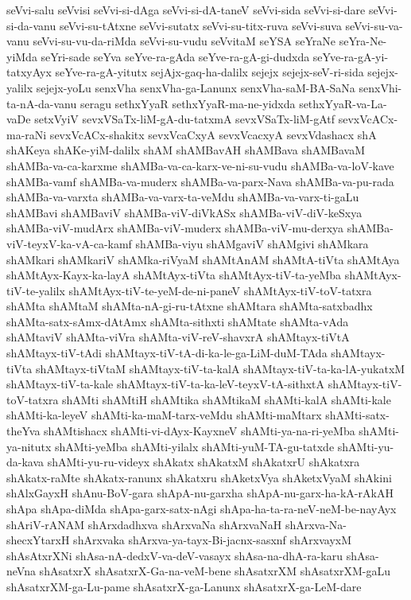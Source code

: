 {seVvi-salu
seVvisi
seVvi-si-dAga
seVvi-si-dA-taneV
seVvi-sida
seVvi-si-dare
seVvi-si-da-vanu
seVvi-su-tAtxne
seVvi-sutatx
seVvi-su-titx-ruva
seVvi-suva
seVvi-su-va-vanu
seVvi-su-vu-da-riMda
seVvi-su-vudu
seVvitaM
seYSA
seYraNe
seYra-Ne-yiMda
seYri-sade
seYva
seYve-ra-gAda
seYve-ra-gA-gi-dudxda
seYve-ra-gA-yi-tatxyAyx
seYve-ra-gA-yitutx
sejAjx-gaq-ha-dalilx
sejejx
sejejx-seV-ri-sida
sejejx-yalilx
sejejx-yoLu
senxVha
senxVha-ga-Lanunx
senxVha-saM-BA-SaNa
senxVhi-ta-nA-da-vanu
seragu
sethxYyaR
sethxYyaR-ma-ne-yidxda
sethxYyaR-va-La-vaDe
setxVyiV
sevxVSaTx-liM-gA-du-tatxmA
sevxVSaTx-liM-gAtf
sevxVcACx-ma-raNi
sevxVcACx-shakitx
sevxVcaCxyA
sevxVcacxyA
sevxVdashacx
shA
shAKeya
shAKe-yiM-dalilx
shAM
shAMBavAH
shAMBava
shAMBavaM
shAMBa-va-ca-karxme
shAMBa-va-ca-karx-ve-ni-su-vudu
shAMBa-va-loV-kave
shAMBa-vamf
shAMBa-va-muderx
shAMBa-va-parx-Nava
shAMBa-va-pu-rada
shAMBa-va-varxta
shAMBa-va-varx-ta-veMdu
shAMBa-va-varx-ti-gaLu
shAMBavi
shAMBaviV
shAMBa-viV-diVkASx
shAMBa-viV-diV-keSxya
shAMBa-viV-mudArx
shAMBa-viV-muderx
shAMBa-viV-mu-derxya
shAMBa-viV-teyxV-ka-vA-ca-kamf
shAMBa-viyu
shAMgaviV
shAMgivi
shAMkara
shAMkari
shAMkariV
shAMka-riVyaM
shAMtAnAM
shAMtA-tiVta
shAMtAya
shAMtAyx-Kayx-ka-layA
shAMtAyx-tiVta
shAMtAyx-tiV-ta-yeMba
shAMtAyx-tiV-te-yalilx
shAMtAyx-tiV-te-yeM-de-ni-paneV
shAMtAyx-tiV-toV-tatxra
shAMta
shAMtaM
shAMta-nA-gi-ru-tAtxne
shAMtara
shAMta-satxbadhx
shAMta-satx-sAmx-dAtAmx
shAMta-sithxti
shAMtate
shAMta-vAda
shAMtaviV
shAMta-viVra
shAMta-viV-reV-shavxrA
shAMtayx-tiVtA
shAMtayx-tiV-tAdi
shAMtayx-tiV-tA-di-ka-le-ga-LiM-duM-TAda
shAMtayx-tiVta
shAMtayx-tiVtaM
shAMtayx-tiV-ta-kalA
shAMtayx-tiV-ta-ka-lA-yukatxM
shAMtayx-tiV-ta-kale
shAMtayx-tiV-ta-ka-leV-teyxV-tA-sithxtA
shAMtayx-tiV-toV-tatxra
shAMti
shAMtiH
shAMtika
shAMtikaM
shAMti-kalA
shAMti-kale
shAMti-ka-leyeV
shAMti-ka-maM-tarx-veMdu
shAMti-maMtarx
shAMti-satx-theYva
shAMtishacx
shAMti-vi-dAyx-KayxneV
shAMti-ya-na-ri-yeMba
shAMti-ya-nitutx
shAMti-yeMba
shAMti-yilalx
shAMti-yuM-TA-gu-tatxde
shAMti-yu-da-kava
shAMti-yu-ru-videyx
shAkatx
shAkatxM
shAkatxrU
shAkatxra
shAkatx-raMte
shAkatx-ranunx
shAkatxru
shAketxVya
shAketxVyaM
shAkini
shAlxGayxH
shAnu-BoV-gara
shApA-nu-garxha
shApA-nu-garx-ha-kA-rAkAH
shApa
shApa-diMda
shApa-garx-satx-nAgi
shApa-ha-ta-ra-neV-neM-be-nayAyx
shAriV-rANAM
shArxdadhxva
shArxvaNa
shArxvaNaH
shArxva-Na-shecxYtarxH
shArxvaka
shArxva-ya-tayx-Bi-jacnx-sasxnf
shArxvayxM
shAsAtxrXNi
shAsa-nA-dedxV-va-deV-vasayx
shAsa-na-dhA-ra-karu
shAsa-neVna
shAsatxrX
shAsatxrX-Ga-na-veM-bene
shAsatxrXM
shAsatxrXM-gaLu
shAsatxrXM-ga-Lu-pame
shAsatxrX-ga-Lanunx
shAsatxrX-ga-LeM-dare
}
